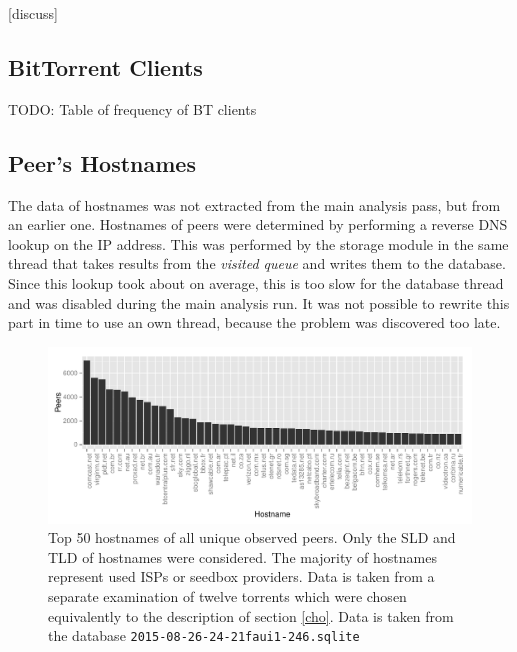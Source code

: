 \documentclass[10pt, a4paper, twoside, headsepline]{scrbook}
\renewcommand{\_}{\origunderscore\allowbreak}
\begin{document}
[discuss]

\subsection{BitTorrent Clients}
\label{clients}
TODO: Table of frequency of BT clients

\subsection{Peer's Hostnames}
The data of hostnames was not extracted from the main analysis pass, but from an earlier one. Hostnames of peers were determined by performing a reverse DNS lookup on the IP address. This was performed by the storage module in the same thread that takes results from the \emph{visited queue} and writes them to the database. Since this lookup took about  on average, this is too slow for the database thread and was disabled during the main analysis run. It was not possible to rewrite this part in time to use an own thread, because the problem was discovered too late.

\begin{figure}
\centering
\includegraphics[width=\textwidth]{../result/2015-08-26_11-24-21_faui1-246_hostnames}
\caption[Most observed ISPs by hostnames]{Top 50 hostnames of all unique observed peers. Only the SLD and TLD of hostnames were considered. The majority of hostnames represent used ISPs or seedbox providers. Data is taken from a separate examination of twelve torrents which were chosen equivalently to the description of section \ref{cho}. Data is taken from the database \texttt{2015-08-26\_11-24-21\_faui1-246.sqlite}}
\label{hostname}
\end{figure}
\end{document}
